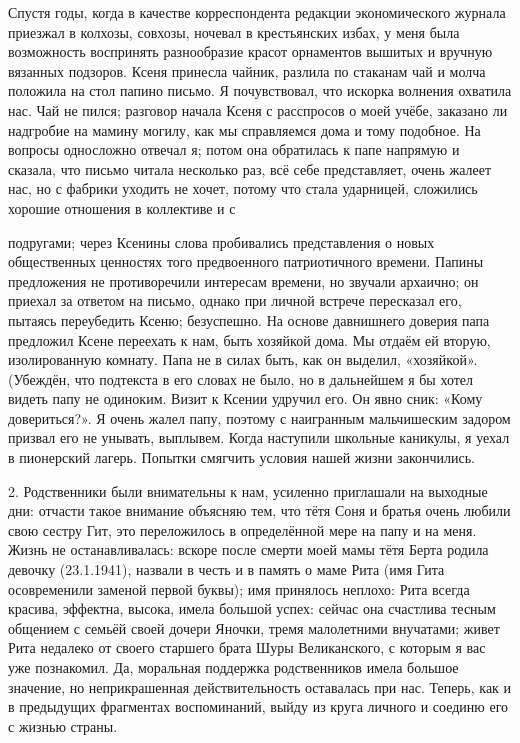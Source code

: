 \label{195-1}
Спустя годы, когда в качестве корреспондента редакции экономического журнала приезжал в колхозы, совхозы, ночевал в крестьянских избах, у меня была возможность воспринять разнообразие красот орнаментов вышитых и вручную вязанных подзоров. Ксеня принесла чайник, разлила по стаканам чай и молча положила на стол папино письмо. Я почувствовал, что искорка волнения охватила нас. Чай не пился; разговор начала Ксеня с расспросов о моей учёбе, заказано ли надгробие на мамину могилу, как мы справляемся дома и тому подобное. На вопросы односложно отвечал я; потом она обратилась к папе напрямую и сказала, что письмо читала несколько раз, всё себе представляет, очень жалеет нас, но с фабрики уходить не хочет, потому что стала ударницей, сложились хорошие отношения в коллективе и с 

\label{196-1}
подругами; через Ксенины слова пробивались представления о новых общественных ценностях того предвоенного патриотичного времени. Папины предложения не противоречили интересам времени, но звучали архаично; он приехал за ответом на письмо, однако при личной встрече пересказал его, пытаясь переубедить Ксеню; безуспешно. На основе давнишнего доверия папа предложил Ксене переехать к нам, быть хозяйкой дома. Мы отдаём ей вторую, изолированную комнату. Папа не в силах быть, как он выделил, «хозяйкой». (Убеждён, что подтекста в его словах не было, но в дальнейшем я бы хотел видеть папу не одиноким. Визит к Ксении удручил его. Он явно сник: «Кому довериться?». Я очень жалел папу, поэтому с наигранным мальчишеским задором призвал его не унывать, выплывем. Когда наступили школьные каникулы, я уехал в пионерский лагерь. Попытки смягчить условия нашей жизни закончились.

\label{197-1}
2. Родственники были внимательны к нам, усиленно приглашали на выходные дни: отчасти такое внимание объясняю тем, что тётя Соня и братья очень любили свою сестру Гит, это переложилось в определённой мере на папу и на меня. Жизнь не останавливалась: вскоре после смерти моей мамы тётя Берта родила девочку (23.1.1941), назвали в честь и в память о маме Рита (имя Гита осовременили заменой первой буквы); имя принялось неплохо: Рита всегда красива, эффектна, высока, имела большой успех: сейчас она счастлива тесным общением с семьёй своей дочери Яночки, тремя малолетними внучатами; живет Рита недалеко от своего старшего брата Шуры Великанского, с которым я вас уже познакомил. Да, моральная поддержка родственников имела большое значение, но неприкрашенная действительность оставалась при нас.
Теперь, как и в предыдущих фрагментах воспоминаний, выйду из круга личного и соединю его с жизнью страны.